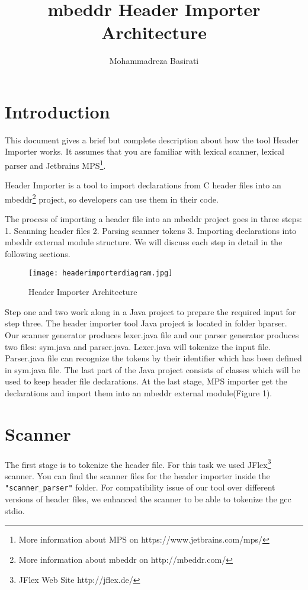 \documentclass{article}
\newcommand{\subtitle}[1]{%
  \posttitle{%
    \par\end{center}
    \begin{center}\large#1\end{center}
    \vskip0.5em}%
}
\begin{document}
\title{mbeddr Header Importer Architecture}
\subtitle{How Header Importer Works?}
\author{Mohammadreza Basirati}
\maketitle

\section{Introduction}
This document gives a brief but complete description about how the tool Header Importer works. It assumes that you are familiar with lexical scanner, lexical parser and Jetbrains MPS\footnote{More information about MPS on https://www.jetbrains.com/mps/}. 

Header Importer is a tool to import declarations from C header files into an mbeddr\footnote{More information about mbeddr on http://mbeddr.com/} project, so developers can use them in their code.

The process of importing a header file into an mbeddr project goes in three steps: 1. Scanning header files 2. Parsing scanner tokens 3. Importing declarations into mbeddr external module structure. We will discuss each step in detail in the following sections.

\begin{figure}
\caption{Header Importer Architecture}
\texttt{[image: headerimporterdiagram.jpg]}
\end{figure}

Step one and two work along in a Java project to prepare the required input for step three. The header importer tool Java project is located in folder bparser. Our scanner generator produces lexer.java file and our parser generator produces two files: sym.java and parser.java. Lexer.java will tokenize the input file. Parser.java file can recognize the tokens by their identifier which has been defined in sym.java file. The last part of the Java project consists of classes which will be used to keep header file declarations. At the last stage, MPS importer get the declarations and import them into an mbeddr external module(Figure 1).

\section{Scanner}
The first stage is to tokenize the header file. For this task we used JFlex\footnote{JFlex Web Site http://jflex.de/} scanner. You can find the scanner files for the header importer inside the \texttt{"scanner\_parser"} folder. For compatibility issue of our tool over different versions of header files, we enhanced the scanner to be able to tokenize the gcc stdio.
\end{document}
